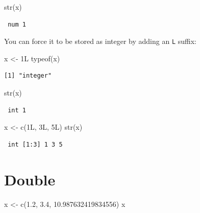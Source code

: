 \documentclass[
]{book}
\newenvironment{Shaded}{\begin{snugshade}}{\end{snugshade}}
\newcommand{\FloatTok}[1]{\textcolor[rgb]{0.00,0.00,0.81}{#1}}
\newcommand{\FunctionTok}[1]{\textcolor[rgb]{0.00,0.00,0.00}{#1}}
\newcommand{\NormalTok}[1]{#1}
\newcommand{\OtherTok}[1]{\textcolor[rgb]{0.56,0.35,0.01}{#1}}
\begin{document}
\begin{Shaded}
\begin{Highlighting}[]
\FunctionTok{str}\NormalTok{(x)}
\end{Highlighting}
\end{Shaded}

\begin{verbatim}
 num 1
\end{verbatim}

You can force it to be stored as integer by adding an \texttt{L} suffix:

\begin{Shaded}
\begin{Highlighting}[]
\NormalTok{x }\OtherTok{\textless{}{-}}\NormalTok{ 1L}
\FunctionTok{typeof}\NormalTok{(x)}
\end{Highlighting}
\end{Shaded}

\begin{verbatim}
[1] "integer"
\end{verbatim}

\begin{Shaded}
\begin{Highlighting}[]
\FunctionTok{str}\NormalTok{(x)}
\end{Highlighting}
\end{Shaded}

\begin{verbatim}
 int 1
\end{verbatim}

\begin{Shaded}
\begin{Highlighting}[]
\NormalTok{x }\OtherTok{\textless{}{-}} \FunctionTok{c}\NormalTok{(1L, 3L, 5L)}
\FunctionTok{str}\NormalTok{(x)}
\end{Highlighting}
\end{Shaded}

\begin{verbatim}
 int [1:3] 1 3 5
\end{verbatim}

\hypertarget{double}{%
\section{Double}\label{double}}

\begin{Shaded}
\begin{Highlighting}[]
\NormalTok{x }\OtherTok{\textless{}{-}} \FunctionTok{c}\NormalTok{(}\FloatTok{1.2}\NormalTok{, }\FloatTok{3.4}\NormalTok{, }\FloatTok{10.987632419834556}\NormalTok{)}
\NormalTok{x}
\end{Highlighting}
\end{Shaded}
\end{document}
